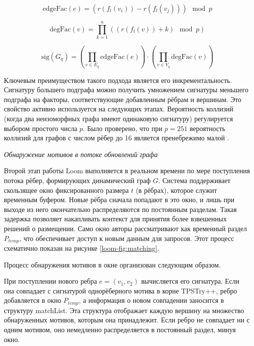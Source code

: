 \begin{equation}\label{loom-eq:edge-factor}
    \text{edgeFac}(e) = (r(f_l(v_i)) - r(f_l(v_j))) \mod p
\end{equation}

\begin{equation}\label{loom-eq:vertex-factor}
    \text{degFac}(v) = \prod_{k=1}^{n} ((r(f_l(v)) + k) \mod p)
\end{equation}

\begin{equation}\label{loom-eq:final-signature}
    \text{sig}(G_q) = \left(\prod_{e \in E_q} \text{edgeFac}(e)\right) \cdot
    \left(\prod_{v \in V_q} \text{degFac}(v)\right)
\end{equation}

Ключевым преимуществом такого подхода является его инкрементальность. Сигнатуру большего подграфа можно получить умножением сигнатуры меньшего подграфа на факторы, соответствующие добавленным рёбрам и вершинам. Это свойство активно используется на следующих этапах. Вероятность коллизий (когда два неизоморфных графа имеют одинаковую сигнатуру) регулируется выбором простого числа $p$. Было проверено, что при $p = 251$ вероятность коллизий для графов с числом рёбер до 16 является пренебрежимо малой \cite{loom}.

\textit{Обнаружение мотивов в потоке обновлений графа}

Второй этап работы Loom выполняется в реальном времени по мере поступления потока рёбер, формирующих динамический граф $G$. Система поддерживает скользящее окно фиксированного размера $t$ (в рёбрах), которое служит временным буфером. Новые рёбра сначала попадают в это окно, и лишь при выходе из него окончательно распределяются по постоянным разделам. Такая задержка позволяет накапливать контекст для принятия более взвешенных решений о размещении. Само окно авторы рассматривают как временный раздел $P_{temp}$, что обеспечивает доступ к новым данным для запросов. Этот процесс схематично показан на рисунке \ref{loom-fig:matching}.

Процесс обнаружения мотивов в окне организован следующим образом.

При поступлении нового ребра $e = (v_1, v_2)$ вычисляется его сигнатура. Если она совпадает с сигнатурой однорёберного мотива в корне TPSTry++, ребро добавляется в окно $P_{temp}$, а информация о новом совпадении заносится в структуру matchList. Эта структура отображает каждую вершину на множество обнаруженных мотивов, которым она принадлежит. Если ребро не совпадает ни с одним мотивом, оно немедленно распределяется в постоянный раздел, минуя окно.

